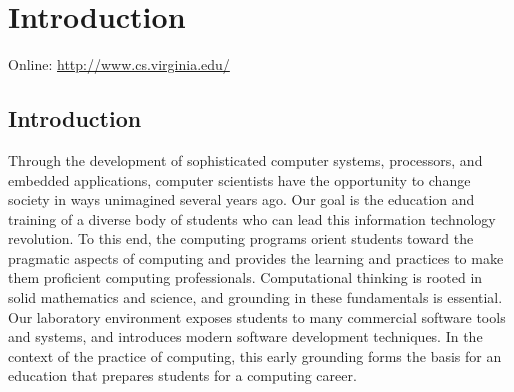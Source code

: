 \documentclass[10pt,letter,twocolumn]{book}
\newcommand{\mychapter}[2]{\chapter{#1}\renewcommand{\leftmark}{\textsc{#2}}}
\newcommand{\mysection}[1]{\section{#1}\renewcommand{\rightmark}{#1}}
\begin{document}
\clearpage
\pagestyle{fancy}
\setcounter{page}{1}

\tableofcontents

\cleardoublepage
\setcounter{page}{1}

\mychapter{Introduction}{Introduction}

\noindent Online: \url{http://www.cs.virginia.edu/}

\mysection{Introduction}

Through the development of sophisticated computer systems, processors,
and embedded applications, computer scientists have the opportunity to
change society in ways unimagined several years ago. Our goal is the
education and training of a diverse body of students who can lead this
information technology revolution. To this end, the computing programs
orient students toward the pragmatic aspects of computing and provides
the learning and practices to make them proficient computing
professionals. Computational thinking is rooted in solid mathematics
and science, and grounding in these fundamentals is essential. Our
laboratory environment exposes students to many commercial software
tools and systems, and introduces modern software development
techniques.  In the context of the practice of computing, this early
grounding forms the basis for an education that prepares students for
a computing career.



\end{document}
